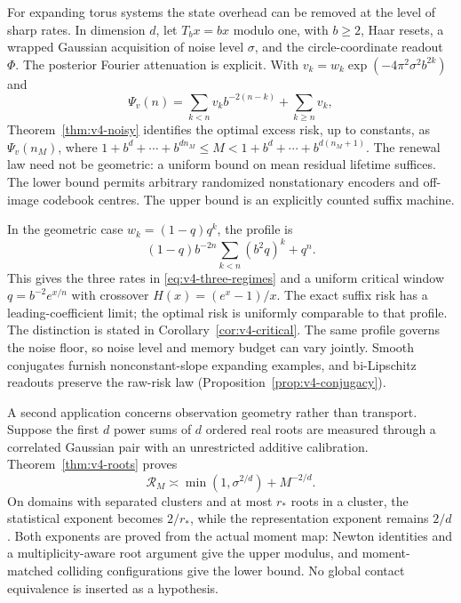 For expanding torus systems the state overhead can be removed at the
level of sharp rates. In dimension $d$, let $T_bx=bx$ modulo one,
with $b\ge2$, Haar resets, a wrapped Gaussian acquisition of noise
level $\sigma$, and the circle-coordinate readout $\Phi$.
The posterior Fourier attenuation is explicit. With
$v_k=w_k\exp(-4\pi^2\sigma^2b^{2k})$ and
\[
 \Psi_v(n)=\sum_{k<n}v_kb^{-2(n-k)}+\sum_{k\ge n}v_k,
\]
Theorem~\ref{thm:v4-noisy} identifies the optimal excess risk, up to
constants, as $\Psi_v(n_M)$, where
$1+b^d+\cdots+b^{dn_M}\le M<1+b^d+\cdots+b^{d(n_M+1)}$.
The renewal law need not be geometric: a uniform bound on mean
residual lifetime suffices. The lower bound permits arbitrary
randomized nonstationary encoders and off-image codebook centres.
The upper bound is an explicitly counted suffix machine.

In the geometric case $w_k=(1-q)q^k$, the profile is
\[
 (1-q)b^{-2n}\sum_{k<n}(b^2q)^k+q^n.
\]
This gives the three rates in \eqref{eq:v4-three-regimes} and a
uniform critical window $q=b^{-2}e^{x/n}$ with crossover
$H(x)=(e^x-1)/x$. The exact suffix risk has a leading-coefficient
limit; the optimal risk is uniformly comparable to that profile.
The distinction is stated in Corollary~\ref{cor:v4-critical}.
The same profile governs the noise floor, so noise level and memory
budget can vary jointly. Smooth conjugates furnish nonconstant-slope
expanding examples, and bi-Lipschitz readouts preserve the raw-risk
law (Proposition~\ref{prop:v4-conjugacy}).

A second application concerns observation geometry rather than
transport. Suppose the first $d$ power sums of $d$ ordered real roots
are measured through a correlated Gaussian pair with an unrestricted
additive calibration. Theorem~\ref{thm:v4-roots} proves
\[
 \mathcal R_M\asymp\min(1,\sigma^{2/d})+M^{-2/d}.
\]
On domains with separated clusters and at most $r_*$ roots in a
cluster, the statistical exponent becomes $2/r_*$, while the
representation exponent remains $2/d$. Both exponents are proved
from the actual moment map: Newton identities and a multiplicity-aware
root argument give the upper modulus, and moment-matched colliding
configurations give the lower bound. No global contact equivalence
is inserted as a hypothesis.

